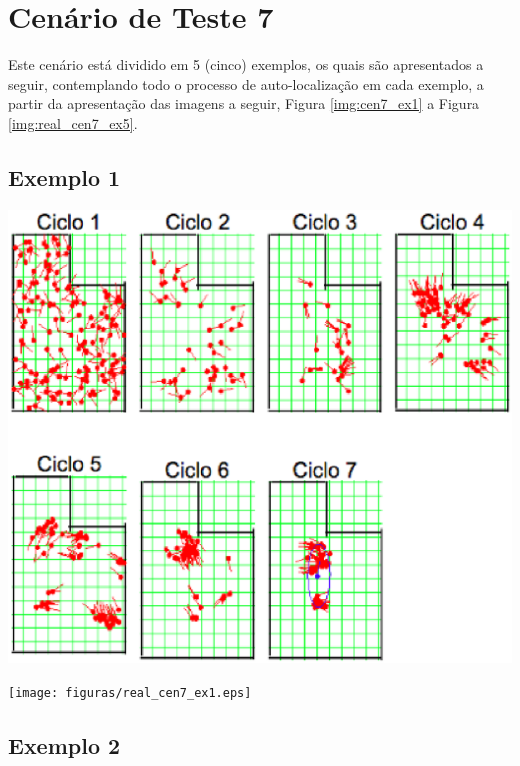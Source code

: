 \section{Cenário de Teste 7}
\label{sec:cenario7}

Este cenário está dividido em 5 (cinco) exemplos, os quais são apresentados a seguir, contemplando todo o processo de auto-localização
em cada exemplo, a partir da apresentação das imagens a seguir, Figura \ref{img:cen7_ex1} a Figura \ref{img:real_cen7_ex5}.

\subsection{Exemplo 1}

{\centering
\includegraphics[scale=0.4]{figuras/cen7_ex1.eps}
\label{img:cen7_ex1}
\par}

{\centering
\texttt{[image: figuras/real\_cen7\_ex1.eps]}
\label{img:real_cen7_ex1}
\par}

\subsection{Exemplo 2}

